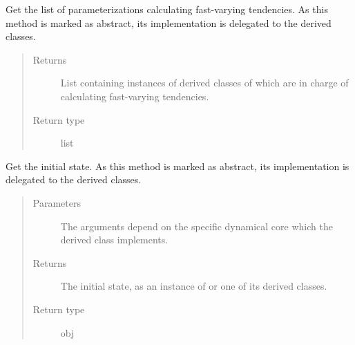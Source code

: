 \documentclass[letterpaper,10pt,english]{sphinxmanual}
\begin{document}
\begin{fulllineitems}
\begin{fulllineitems}
\label{\detokenize{api:tasmania.dycore.dycore.DynamicalCore.fast_tendency_parameterizations}}
Get the list of parameterizations calculating fast-varying tendencies.
As this method is marked as abstract, its implementation is delegated to the derived classes.
\begin{quote}\begin{description}
\item[{Returns}] \leavevmode
List containing instances of derived classes of
{\hyperref[\detokenize{api:tasmania.parameterizations.fast_tendencies.FastTendency}]{}} which are in charge of
calculating fast-varying tendencies.

\item[{Return type}] \leavevmode
list

\end{description}\end{quote}

\end{fulllineitems}


\begin{fulllineitems}
\label{\detokenize{api:tasmania.dycore.dycore.DynamicalCore.get_initial_state}}
Get the initial state.
As this method is marked as abstract, its implementation is delegated to the derived classes.
\begin{quote}\begin{description}
\item[{Parameters}] \leavevmode
{} \textendash{} The arguments depend on the specific dynamical core which the derived class implements.

\item[{Returns}] \leavevmode
The initial state, as an instance of {\hyperref[\detokenize{api:tasmania.storages.grid_data.GridData}]{}} or one of its derived classes.

\item[{Return type}] \leavevmode
obj

\end{description}\end{quote}


\end{fulllineitems}
\end{fulllineitems}
\end{document}

